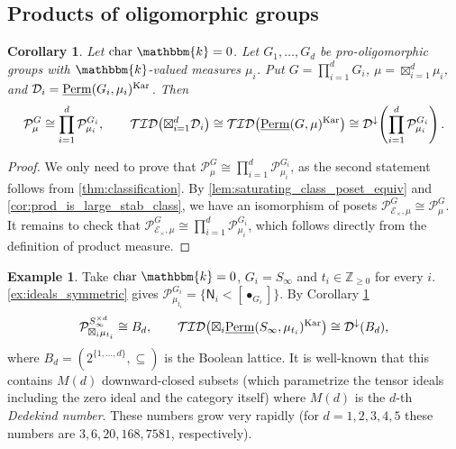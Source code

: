 \documentclass[11pt,a4paper]{amsart}
\theoremstyle{plain}%
\newtheorem{corollary}[lemma]{Corollary}
\theoremstyle{definition}
\newtheorem{example}[lemma]{Example}
\theoremstyle{remark}
\newcommand{\Perm}{\underline{{\rm Perm}}}
\newcommand{\kk}{\mathbbm{k}}
\newcommand{\TID}{\mathcal{TID}}
\newcommand{\Kar}{\mathrm{Kar}}
\newcommand{\Down}{\mathcal{D}^{\downarrow}}
\begin{document}

\subsection{Products of oligomorphic groups}


\begin{corollary}\label{cor:product-poset}
    Let $\mathrm{char}~\kk=0$. Let $G_1,\ldots,G_d$ be pro-oligomorphic groups with $\kk$-valued measures $\mu_i$. Put
$G=\prod_{i=1}^dG_i$, $\mu=\boxtimes_{i=1}^d\mu_i$, and
$\mathcal D_i=\Perm(G_i,\mu_i)^{\Kar}$. Then
\[
 \mathcal P^G_\mu\cong\prod_{i=1}^d\mathcal P^{G_i}_{\mu_i},\qquad
 \TID\!\left(\boxtimes_{i=1}^d\mathcal D_i\right)
 \cong\TID\!\left(\Perm(G,\mu)^{\Kar}\right)
 \cong\Down\!\left(\prod_{i=1}^d\mathcal P^{G_i}_{\mu_i}\right).
\]
\end{corollary}

\begin{proof}

We only need to prove that $\mathcal P^G_\mu\cong\prod_{i=1}^d\mathcal P^{G_i}_{\mu_i}$, as the second statement follows from \cref{thm:classification}. By \cref{lem:saturating_class_poset_equiv} and \cref{cor:prod_is_large_stab_class},
we have an isomorphism of posets $\mathcal{P}^G_{\mathcal{E}_{\times},\mu}\cong \mathcal P^G_\mu$. It remains to check that $\mathcal P^G_{\mathcal{E}_{\times},\mu}\cong\prod_{i=1}^d\mathcal P^{G_i}_{\mu_i}$, which follows directly from the definition of product measure.

\end{proof}


\begin{example}\label{ex:boolean-product-ideals}
Take $\mathrm{char}~\kk=0$, $G_i=S_\infty$ and $t_i\in\mathbb Z_{\geq0}$ for every $i$. \cref{ex:ideals_symmetric} gives
$\mathcal P^{G_i}_{\mu_{t_i}}=\{\mathsf N_i<[\bullet_{G_i}]\}$. By Corollary \ref{cor:product-poset}
\[
 \mathcal P^{S_\infty^{\times d}}_{\boxtimes_i\mu_{t_i}}
 \cong B_d,\qquad
 \TID\!\left(\boxtimes_i\Perm(S_\infty,\mu_{t_i})^{\Kar}\right)
 \cong\Down(B_d),
\]
where $B_d=(2^{\{1,\ldots,d\}},\subseteq)$ is the Boolean lattice. It is well-known that this contains $M(d)$ downward-closed subsets (which parametrize the tensor ideals including the zero ideal and the category itself)
where $M(d)$ is the $d$-th \emph{Dedekind number}. These numbers grow very rapidly (for $d=1,2,3,4,5$ these numbers are
$3,6,20,168,7581$, respectively).
    
\end{example}
\end{document}
